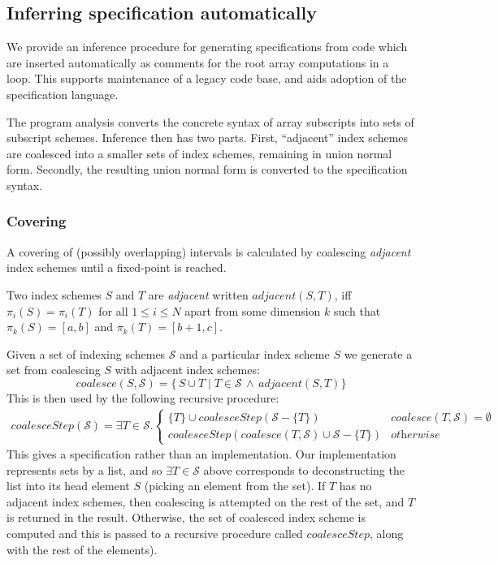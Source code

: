 \subsection{Inferring specification automatically}
\label{subsec:inference}
%
\noindent
We provide an inference procedure for generating specifications from
code which are inserted automatically as comments for the root
array computations in a loop. This supports maintenance of a legacy
code base, and aids adoption of the specification language.

The program analysis converts the concrete syntax of
array subscripts into sets of subscript schemes. Inference then has
two parts. First, ``adjacent'' index schemes are coalesced into a
smaller sets of index schemes, remaining in union normal
form. Secondly, the resulting union normal form is converted to the
specification syntax.

\subsubsection{Covering}
A covering of (possibly overlapping) intervals is calculated
by coalescing \emph{adjacent} index schemes
until a fixed-point is reached.

\newcommand{\contig}[2]{\mathit{adjacent}(#1, #2)}
\begin{defn}[Adjacent]
  \label{def:contiguity}
  Two index schemes $S$ and $T$ are \emph{adjacent} written
  $\contig{S}{T}$, iff $\pi_i(S) = \pi_i(T)$ for all $1 \leq i \leq N$
  apart from some dimension $k$ such that $\pi_k(S) = [a, b]$ and
  $\pi_k(T) = [b+1, c]$.
\end{defn}
%
Given a set of indexing schemes $\mathcal{S}$ and a particular index scheme $S$
we generate a set from coalescing $S$ with adjacent index schemes:
%
\begin{equation*}
\mathit{coalesce}(S, \mathcal{S}) =
  \{\,S \cup T \mid T \in \mathcal{S} \, \wedge \,
  \contig{S}{T} \}
\end{equation*}
%
This is then used by the following recursive procedure:
%
\begin{align*}
  \mathit{coalesceStep}(\mathcal{S}) =
  \exists T \in \mathcal{S} .
  \begin{cases}
    \{T\} \cup \mathit{coalesceStep}(\mathcal{S} - \{T\}) &
    \mathit{coalesce}(T, \mathcal{S}) = \emptyset \\
    \mathit{coalesceStep}(\mathit{coalesce}(T, \mathcal{S}) \cup
                                        \mathcal{S} - \{T\}) & \textit{otherwise}
  \end{cases}
\end{align*}
%
This gives a specification rather than an implementation. Our
implementation represents sets by a list, and so
$\exists T \in \mathcal{S}$ above corresponds to deconstructing
the list into its head element $S$ (picking an element from the set).
If $T$ has no adjacent index schemes, then coalescing is attempted on
the rest of the set, and $T$ is returned in the result. Otherwise,
the set of coalesced index scheme is computed and this is passed to
a recursive procedure called $\mathit{coalesceStep}$, along with the rest of
the elements).

